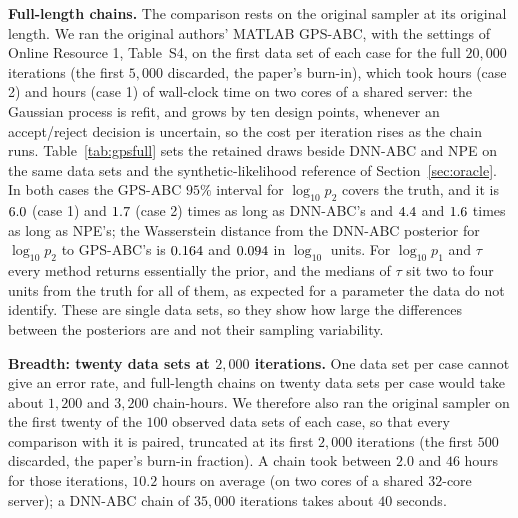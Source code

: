 \documentclass[sn-basic,iicol,pdflatex]{sn-jnl}
\begin{document}
\noindent\textbf{Full-length chains.} The comparison rests on the original sampler at its original length. We ran the original authors' MATLAB GPS-ABC, with the settings of Online Resource 1, Table~S4, on the first data set of each case for the full $20{,}000$ iterations (the first $5{,}000$ discarded, the paper's burn-in), which took \gtrCaseTwoHours{} hours (case 2) and \gtrCaseOneHours{} hours (case 1) of wall-clock time on two cores of a shared server: the Gaussian process is refit, and grows by ten design points, whenever an accept/reject decision is uncertain, so the cost per iteration rises as the chain runs. Table~\ref{tab:gpsfull} sets the retained draws beside DNN-ABC and NPE on the same data sets and the synthetic-likelihood reference of Section~\ref{sec:oracle}. In both cases the GPS-ABC $95\%$ interval for $\log_{10}p_2$ covers the truth, and it is $6.0$ (case 1) and $1.7$ (case 2) times as long as DNN-ABC's and $4.4$ and $1.6$ times as long as NPE's; the Wasserstein distance from the DNN-ABC posterior for $\log_{10}p_2$ to GPS-ABC's is $0.164$ and $0.094$ in $\log_{10}$ units. For $\log_{10}p_1$ and $\tau$ every method returns essentially the prior, and the medians of $\tau$ sit two to four units from the truth for all of them, as expected for a parameter the data do not identify. These are single data sets, so they show how large the differences between the posteriors are and not their sampling variability.

\begin{table}[!t]
\centering
\caption{Study II at the original length: posterior median (and $95\%$ interval length) on the first data set of each case. GPS-ABC ran for $20{,}000$ iterations (first $5{,}000$ discarded); DNN-ABC and NPE are the draws used throughout, and the reference is the synthetic-likelihood sampler of Section~\ref{sec:oracle}. Units are $\log_{10}$ for the rates; an asterisk marks a $95\%$ interval that misses the truth}
\label{tab:gpsfull}
\small

\end{table}

\noindent\textbf{Breadth: twenty data sets at $2{,}000$ iterations.} One data set per case cannot give an error rate, and full-length chains on twenty data sets per case would take about $1{,}200$ and $3{,}200$ chain-hours. We therefore also ran the original sampler on the first twenty of the $100$ observed data sets of each case, so that every comparison with it is paired, truncated at its first $2{,}000$ iterations (the first $500$ discarded, the paper's burn-in fraction). A chain took between $2.0$ and $46$ hours for those iterations, $10.2$ hours on average (on two cores of a shared $32$-core server); a DNN-ABC chain of $35{,}000$ iterations takes about $40$ seconds.
\end{document}
